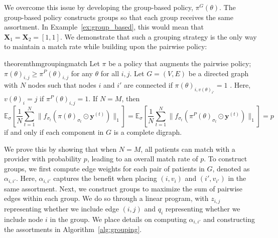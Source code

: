 We overcome this issue by developing the group-based policy, $\pi^{G}(\theta)$. 
The group-based policy constructs groups so that each group receives the same assortment. 
In Example~\ref{ex:group_based}, this would mean that $\mathbf{X}_{1}=\mathbf{X}_{2} = [1,1]$. 
We demonstrate that such a grouping strategy is the only way to maintain a match rate while building upon the pairwise policy: 
\begin{restatable}{theorem}{thmgroupingmatch}
    Let $\pi$ be a policy that augments the pairwise policy; $\pi(\theta)_{i,j} \geq \pi^{P}(\theta)_{i,j}$ for any $\theta$ for all $i,j$. 
    Let $G = (V,E)$ be a directed graph with $N$ nodes such that nodes $i$ and $i'$ are connected if $\pi(\theta)_{i,v(\theta)_{i'}} = 1$ . 
    Here, $v(\theta)_{i} = j$ if $\pi^{P}(\theta)_{i,j} = 1$.
    If $N=M$, then 
    \begin{equation}
        \mathbb{E}_{\sigma}[\frac{1}{N} \sum_{t=1}^{N} \lVert f_{\sigma_{t}} \left(\pi(\theta)_{\sigma_{t}} \odot \mathbf{y}^{(t)} \right) \rVert_{1}] = \mathbb{E}_{\sigma}[\frac{1}{N}\sum_{t=1}^{N} \lVert f_{\sigma_{t}} \left(\pi^{P}(\theta)_{\sigma_{t}} \odot \mathbf{y}^{(t)} \right) \rVert_{1}] = p
    \end{equation}
    if and only if each component in $G$ is a complete digraph.      
\end{restatable}
We prove this by showing that when $N=M$, all patients can match with a provider with probability $p$, leading to an overall match rate of $p$. 
To construct groups, we first compute edge weights for each pair of patients in $G$, denoted as $\alpha_{i,i'}$.
Here, $\alpha_{i,i'}$ captures the benefit when placing $(i,v_{i})$ and $(i',v_{i'})$ in the same assortment. 
Next, we construct groups to maximize the sum of pairwise edges within each group. 
We do so through a linear program, with $z_{i,j}$ representing whether we include edge $(i,j)$ and $q_{i}$ representing whether we include node $i$ in the group. 
We place details on computing $\alpha_{i, i'}$ and constructing the assortments in Algorithm~\ref{alg:grouping}. 

